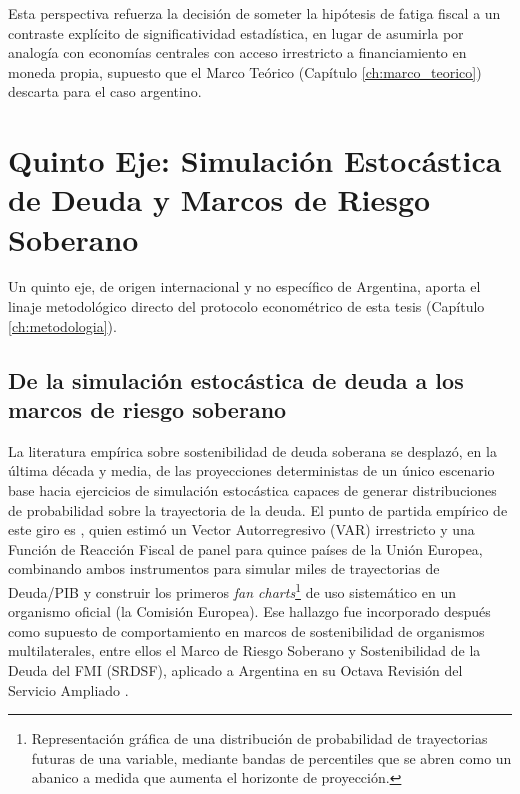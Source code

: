 Esta perspectiva refuerza la decisión de someter la hipótesis de fatiga fiscal a un contraste explícito de significatividad estadística, en lugar de asumirla por analogía con economías centrales con acceso irrestricto a financiamiento en moneda propia, supuesto que el Marco Teórico (Capítulo \ref{ch:marco_teorico}) descarta para el caso argentino.

\section{Quinto Eje: Simulación Estocástica de Deuda y Marcos de Riesgo Soberano}
\label{sec:eje_simulacion}

Un quinto eje, de origen internacional y no específico de Argentina, aporta el linaje metodológico directo del protocolo econométrico de esta tesis (Capítulo \ref{ch:metodologia}).

\subsection{De la simulación estocástica de deuda a los marcos de riesgo soberano}
La literatura empírica sobre sostenibilidad de deuda soberana se desplazó, en la última década y media, de las proyecciones deterministas de un único escenario base hacia ejercicios de simulación estocástica capaces de generar distribuciones de probabilidad sobre la trayectoria de la deuda. El punto de partida empírico de este giro es \citet{medeiros2012}, quien estimó un Vector Autorregresivo (VAR) irrestricto y una Función de Reacción Fiscal de panel para quince países de la Unión Europea, combinando ambos instrumentos para simular miles de trayectorias de Deuda/PIB y construir los primeros \textit{fan charts}\footnote{Representación gráfica de una distribución de probabilidad de trayectorias futuras de una variable, mediante bandas de percentiles que se abren como un abanico a medida que aumenta el horizonte de proyección.} de uso sistemático en un organismo oficial (la Comisión Europea). Ese hallazgo fue incorporado después como supuesto de comportamiento en marcos de sostenibilidad de organismos multilaterales, entre ellos el Marco de Riesgo Soberano y Sostenibilidad de la Deuda del FMI (SRDSF), aplicado a Argentina en su Octava Revisión del Servicio Ampliado \citep{imf2024}.

